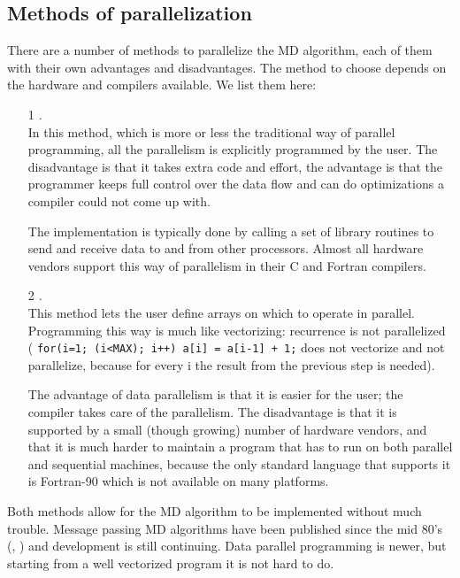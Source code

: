 \subsection{Methods of parallelization}
There are a number of methods to parallelize the MD algorithm, each of
them with their own advantages and disadvantages. The method to 
choose depends on the hardware and compilers available.
We list them here:
\begin{enumerate}
\item[1]        {\em {}.}\\
                In this method, which is more or less the traditional
                way of parallel programming, all the parallelism is
                explicitly programmed by the user. The disadvantage
                is that it takes extra code and effort, the advantage
                is that the programmer keeps full control over the data
                flow and can do optimizations a compiler could not come 
                up with. 

                The implementation is typically done by calling a set of 
                library routines to send and receive data to and from 
                other processors. Almost all hardware vendors support 
                this way of
                parallelism in their C and Fortran compilers.
                
\item[2]        {\em {}.}\\
                This method lets the user define arrays on which to
                operate in parallel. Programming this way is much
                like vectorizing: recurrence is not parallelized
                ({\eg} {\tt for(i=1; (i<MAX); i++) a[i] = a[i-1] + 1;}
                does not vectorize and not parallelize, because for
                every i the result from the previous step is needed).

                The advantage of data parallelism is that it is
                easier for the user; the compiler takes care of the
                parallelism. The disadvantage is that it is supported
                by a small (though growing) number of hardware vendors,
                and that it is much harder to maintain a program that has to
                run on both parallel and sequential machines, because
                the only standard language that supports it is Fortran-90
                which is not available on many platforms.
\end{enumerate}
Both methods allow for the MD algorithm to be implemented without much
trouble. Message passing MD algorithms have been published
since the mid 80's (\cite{Fincham87}, \cite{Raine89}) 
and development is still continuing. 
Data parallel programming is newer,
but starting from a well vectorized program it is not hard to do.

